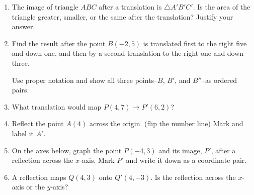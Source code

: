\documentclass[12pt, twoside]{article}
\begin{document}
\begin{enumerate}
\item The image of triangle $ABC$ after a translation is $\triangle A'B'C'$. Is the area of the triangle greater, smaller, or the same after the translation? Justify your answer. \vspace{4cm}

\item Find the result after the point $B(-2,5)$ is translated first to the right five and down one, and then by a second translation to the right one and down three. \par 
Use proper notation and show all three points--$B$, $B'$, and $B''$--as ordered pairs. \vspace{3cm}

\item What translation would map $P(4,7)\rightarrow P'(6,2)$?

\newpage
\item Reflect the point $A(4)$ across the origin. (flip the number line) Mark and label it $A'$.
  \begin{center}
    \end{center}

  \item On the axes below, graph the point $P(-4,3)$ and its image, $P'$, after a reflection across the $x$-axis. Mark $P'$ and write it down as a coordinate pair.
    \begin{center}
  \end{center}

\item A reflection maps $Q(4,3)$ onto $Q'(4,-3)$. Is the reflection across the $x$-axis or the $y$-axis? \vspace{1cm}


\end{enumerate}
\end{document}
